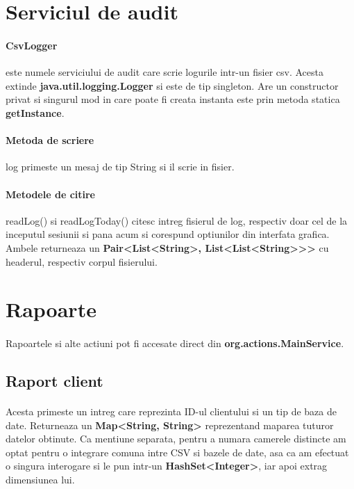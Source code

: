 \documentclass[oneside]{article}
\begin{document}
\section[Serviciul de audit]{Serviciul de audit}
\paragraph{CsvLogger} este numele serviciului de audit care scrie logurile intr-un fisier csv. Acesta extinde \textbf{java.util.logging.Logger} si este de tip singleton. Are un constructor privat si singurul mod in care poate fi creata instanta este prin metoda statica \textbf{getInstance}.

\paragraph{Metoda de scriere} log primeste un mesaj de tip String si il scrie in fisier.

\paragraph{Metodele de citire} readLog() si readLogToday() citesc intreg fisierul de log, respectiv doar cel de la inceputul sesiunii si pana acum si corespund optiunilor din interfata grafica. Ambele returneaza un \textbf{Pair<List<String>, List<List<String>{}>{}>} cu headerul, respectiv corpul fisierului.

\section[Rapoarte]{Rapoarte}
\paragraph{} Rapoartele si alte actiuni pot fi accesate direct din \textbf{org.actions.MainService}.

\subsection[Raport client]{Raport client}
\paragraph{} Acesta primeste un intreg care reprezinta ID-ul clientului si un tip de baza de date. Returneaza un \textbf{Map<String, String>} reprezentand maparea tuturor datelor obtinute. Ca mentiune separata, pentru a numara camerele distincte am optat pentru o integrare comuna intre CSV si bazele de date, asa ca am efectuat o singura interogare si le pun intr-un \textbf{HashSet<Integer>}, iar apoi extrag dimensiunea lui.
\end{document}
